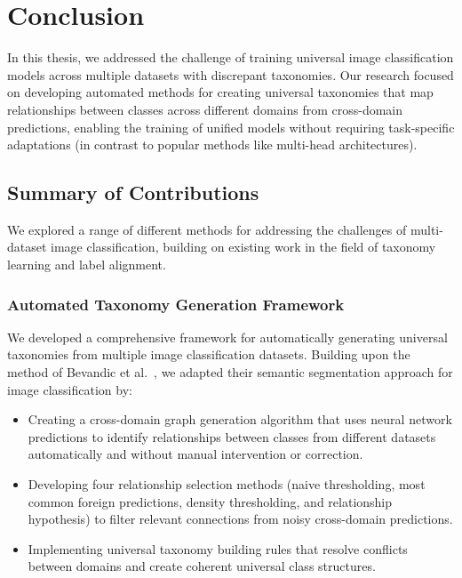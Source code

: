 \chapter{Conclusion}

In this thesis,
we addressed the challenge of training universal image classification models
across multiple datasets with discrepant taxonomies.
Our research focused on developing automated methods for creating universal taxonomies
that map relationships between classes across different domains
from cross-domain predictions,
enabling the training of unified models without requiring task-specific adaptations
(in contrast to popular methods like multi-head architectures).

\section{Summary of Contributions}

We explored a range of different methods for addressing the challenges of multi-dataset image classification,
building on existing work in the field of taxonomy learning and label alignment.

\subsection{Automated Taxonomy Generation Framework}

We developed a comprehensive framework for automatically generating universal taxonomies
from multiple image classification datasets.
Building upon the method of Bevandic et al.~\cite{bevandic_automatic_2022,bevandic_weakly_2024},
we adapted their semantic segmentation approach for image classification by:

\begin{itemize}
    \item Creating a cross-domain graph generation algorithm that uses neural network predictions
          to identify relationships between classes from different datasets automatically
          and without manual intervention or correction.
    \item Developing four relationship selection methods
          (naive thresholding, most common foreign predictions, density thresholding,
          and relationship hypothesis) to filter relevant connections from noisy cross-domain predictions.
    \item Implementing universal taxonomy building rules that resolve conflicts
          between domains and create coherent universal class structures.
\end{itemize}

